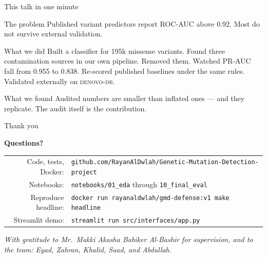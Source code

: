 \begin{frame}{This talk in one minute}
  \begin{block}{The problem}
    Published variant predictors report ROC-AUC above 0.92.
    Most do not survive external validation.
  \end{block}

  \begin{block}{What we did}
    Built a classifier for 195k missense variants.
    Found three contamination sources in our own pipeline.
    Removed them. Watched PR-AUC fall from 0.955 to 0.838.
    Re-scored published baselines under the same rules.
    Validated externally on \textsc{denovo-db}.
  \end{block}

  \begin{exampleblock}{What we found}
    Audited numbers are smaller than inflated ones --- and they replicate.
    The audit itself is the contribution.
  \end{exampleblock}
\end{frame}



\begin{frame}{Thank you}
  \centering
  \vspace{1em}

  {\Large \textbf{Questions?}}

  \vspace{2em}
  \footnotesize
  \begin{tabular}{rl}
    Code, tests, Docker:    & \texttt{github.com/RayanAlDwlah/Genetic-Mutation-Detection-project} \\
    Notebooks:              & \texttt{notebooks/01\_eda} through \texttt{10\_final\_eval} \\
    Reproduce headline:     & \texttt{docker run rayanaldwlah/gmd-defense:v1 make headline} \\
    Streamlit demo:         & \texttt{streamlit run src/interfaces/app.py} \\
  \end{tabular}

  \vspace{2em}
  \footnotesize
  \emph{With gratitude to Mr.\ Makki Akasha Babiker Al-Bashir for supervision, and to the team:
  Eyad, Zahran, Khalid, Saad, and Abdullah.}
\end{frame}


